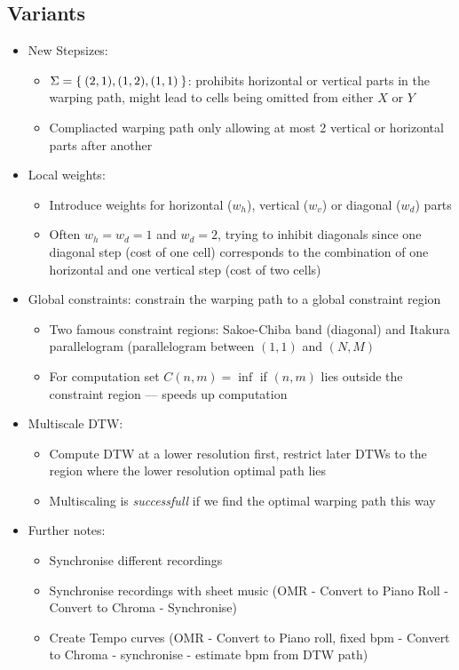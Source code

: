 \subsection{Variants}
\begin{itemize}
	\item
		New Stepsizes:
		\begin{itemize}
			\item
				$\Sigma = \Set{(2,1),(1,2),(1,1)}$: prohibits horizontal or vertical parts in the warping path, might lead to cells being omitted from either $X$ or $Y$
			\item
				Compliacted warping path only allowing at most 2 vertical or horizontal parts after another
		\end{itemize}
	\item
		Local weights:
		\begin{itemize}
			\item
				Introduce weights for horizontal ($w_h$), vertical ($w_v$) or diagonal ($w_d$) parts
			\item
				Often $w_h = w_d = 1$ and $w_d = 2$, trying to inhibit diagonals since one diagonal step (cost of one cell) corresponds to the combination of one horizontal and one vertical step (cost of two cells)
		\end{itemize}
	\item
		Global constraints: constrain the warping path to a global constraint region
		\begin{itemize}
			\item
				Two famous constraint regions: Sakoe-Chiba band (diagonal) and Itakura parallelogram (parallelogram between $(1,1)$ and $(N,M)$
			\item
				For computation set $C(n,m) = \inf$ if $(n,m)$ lies outside the constraint region --- speeds up computation
		\end{itemize}

	\item
		Multiscale DTW:
		\begin{itemize}
			\item
				Compute DTW at a lower resolution first, restrict later DTWs to the region where the lower resolution optimal path lies
			\item
				Multiscaling is \textit{successfull} if we find the optimal warping path this way
		\end{itemize}

	\item
		Further notes:
		\begin{itemize}
			\item
				Synchronise different recordings
			\item
				Synchronise recordings with sheet music (OMR - Convert to Piano Roll - Convert to Chroma - Synchronise)
			\item
				Create Tempo curves (OMR - Convert to Piano roll, fixed bpm - Convert to Chroma - synchronise - estimate bpm from DTW path)
		\end{itemize}

\end{itemize}


